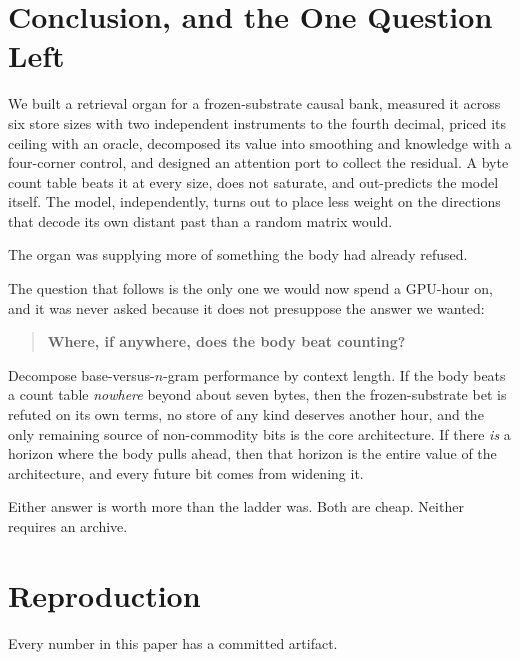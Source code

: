 \documentclass[11pt,a4paper]{article}
\begin{document}
\section{Conclusion, and the One Question Left}

We built a retrieval organ for a frozen-substrate causal bank, measured it across
six store sizes with two independent instruments to the fourth decimal, priced its
ceiling with an oracle, decomposed its value into smoothing and knowledge with a
four-corner control, and designed an attention port to collect the residual. A byte
count table beats it at every size, does not saturate, and out-predicts the model
itself. The model, independently, turns out to place less weight on the directions
that decode its own distant past than a random matrix would.

The organ was supplying more of something the body had already refused.

The question that follows is the only one we would now spend a GPU-hour on, and it
was never asked because it does not presuppose the answer we wanted:

\begin{quote}
\textbf{Where, if anywhere, does the body beat counting?}
\end{quote}

Decompose base-versus-$n$-gram performance by context length. If the body beats a
count table \emph{nowhere} beyond about seven bytes, then the frozen-substrate bet
is refuted on its own terms, no store of any kind deserves another hour, and the
only remaining source of non-commodity bits is the core architecture. If there
\emph{is} a horizon where the body pulls ahead, then that horizon is the entire
value of the architecture, and every future bit comes from widening it.

Either answer is worth more than the ladder was. Both are cheap. Neither requires
an archive.

\section*{Reproduction}

Every number in this paper has a committed artifact.
\end{document}

